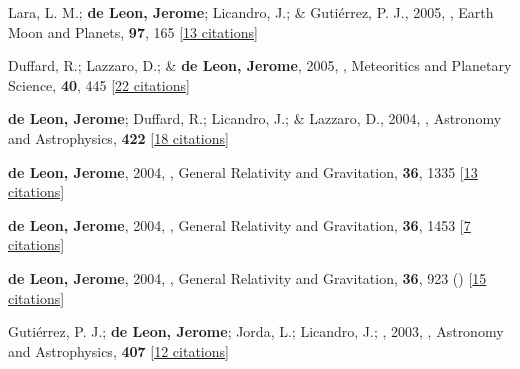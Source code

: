 \item[{\color{numcolor}\scriptsize16}] Lara, L. M.; \textbf{de Leon, Jerome}; Licandro, J.; \& Guti{\'e}rrez, P. J., 2005, , Earth Moon and Planets, \textbf{97}, 165 [\href{https://ui.adsabs.harvard.edu/abs/2005EM&P...97..165L}{13 citations}]

\item[{\color{numcolor}\scriptsize15}] Duffard, R.; Lazzaro, D.; \& \textbf{de Leon, Jerome}, 2005, , Meteoritics and Planetary Science, \textbf{40}, 445 [\href{https://ui.adsabs.harvard.edu/abs/2005M&PS...40..445D}{22 citations}]

\item[{\color{numcolor}\scriptsize14}] \textbf{de Leon, Jerome}; Duffard, R.; Licandro, J.; \& Lazzaro, D., 2004, , Astronomy and Astrophysics, \textbf{422} [\href{https://ui.adsabs.harvard.edu/abs/2004A&A...422L..59D}{18 citations}]

\item[{\color{numcolor}\scriptsize13}] \textbf{de Leon, Jerome}, 2004, , General Relativity and Gravitation, \textbf{36}, 1335 [\href{https://ui.adsabs.harvard.edu/abs/2004GReGr..36.1335D}{13 citations}]

\item[{\color{numcolor}\scriptsize12}] \textbf{de Leon, Jerome}, 2004, , General Relativity and Gravitation, \textbf{36}, 1453 [\href{https://ui.adsabs.harvard.edu/abs/2004GReGr..36.1453D}{7 citations}]

\item[{\color{numcolor}\scriptsize11}] \textbf{de Leon, Jerome}, 2004, , General Relativity and Gravitation, \textbf{36}, 923 () [\href{https://ui.adsabs.harvard.edu/abs/2004GReGr..36..923D}{15 citations}]

\item[{\color{numcolor}\scriptsize10}] Guti{\'e}rrez, P. J.; \textbf{de Leon, Jerome}; Jorda, L.; Licandro, J.; \etal, 2003, , Astronomy and Astrophysics, \textbf{407} [\href{https://ui.adsabs.harvard.edu/abs/2003A&A...407L..37G}{12 citations}]

